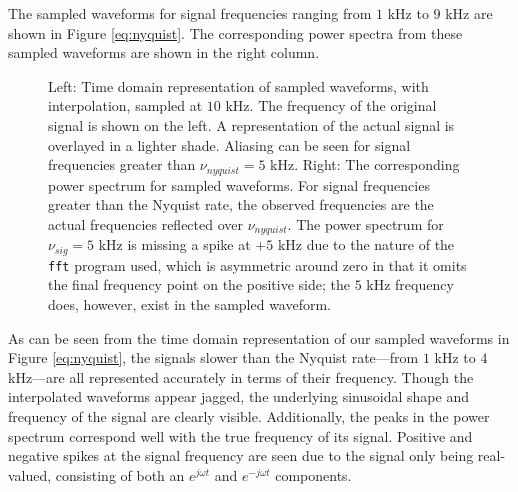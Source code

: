 \documentclass[12pt]{article}
\begin{document}
The sampled waveforms for signal frequencies ranging from $1$ kHz to $9$ kHz are shown in Figure \ref{eq:nyquist}. The corresponding power spectra from these sampled waveforms are shown in the right column.

\begin{figure}[H]
\caption[SODUMB]{Left: Time domain representation of sampled waveforms, with interpolation, sampled at $10$ kHz. The frequency of the original signal is shown on the left. A representation of the actual signal is overlayed in a lighter shade. Aliasing can be seen for signal frequencies greater than $\nu_{nyquist}=5$ kHz. Right: The corresponding power spectrum for sampled waveforms. For signal frequencies greater than the Nyquist rate, the observed frequencies are the actual frequencies reflected over $\nu_{nyquist}$. The power spectrum for $\nu_{sig}=5$ kHz is missing a spike at $+5$ kHz due to the nature of the \texttt{fft} program used, which is asymmetric around zero in that it omits the final frequency point on the positive side; the $5$ kHz frequency does, however, exist in the sampled waveform.}
\label{fig:nyquist}
\end{figure}

As can be seen from the time domain representation of our sampled waveforms in Figure \ref{eq:nyquist}, the signals slower than the Nyquist rate---from $1$ kHz to $4$ kHz---are all represented accurately in terms of their frequency. Though the interpolated waveforms appear jagged, the underlying sinusoidal shape and frequency of the signal are clearly visible. Additionally, the peaks in the power spectrum correspond well with the true frequency of its signal. Positive and negative spikes at the signal frequency are seen due to the signal only being real-valued, consisting of both an $e^{j\omega t}$ and $e^{-j\omega t}$ components.
\end{document}
